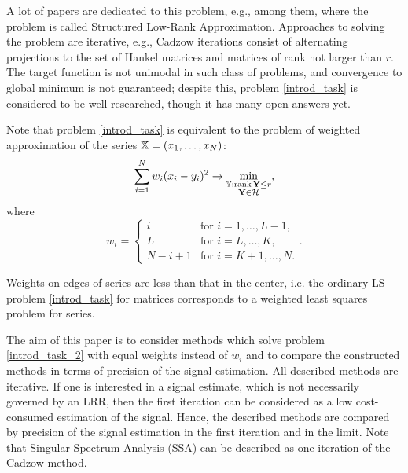 \documentclass[sii]{ipart}
\def\rank{\mathop{\mathrm{rank}}}
\begin{document}
A lot of papers are dedicated to this problem, e.g., \cite{Cadzow1988, Markovsky2011, Usevich.Markovsky2014, Gillard.Zhigljavsky2013} among them, where the problem is called Structured Low-Rank Approximation. Approaches to solving the problem are iterative, e.g., Cadzow iterations \cite{Cadzow1988} consist of alternating projections to the set of Hankel matrices and matrices of rank not larger than $r$. The target function is not unimodal in such class of problems, and convergence to global minimum is not guaranteed; despite this, problem \eqref{introd_task} is considered to be well-researched, though it has many open answers yet.

Note that problem \eqref{introd_task} is equivalent to the problem of weighted approximation of the series $\mathbb{X} = (x_1, \ldots, x_N)$:
\begin{equation}\label{introd_task_2}
\sum_{i = 1}^N w_i(x_i - y_i)^2 \to \min_{\substack{\tsY: \rank \bfY \le r \\ \bfY \in \calH}},
\end{equation}
where
\begin{equation}
\label{eq:w}
w_i = \begin{cases}
i & \text{for $i = 1, \ldots, L-1,$}\\
L & \text{for $i = L, \ldots, K,$}\\
N - i + 1 & \text{for $i = K + 1, \ldots, N.$}
\end{cases}.
\end{equation}

Weights on edges of series are less than that in the center, i.e. the ordinary LS problem \eqref{introd_task} for matrices corresponds to a weighted least squares problem for series.

The aim of this paper is to consider methods which solve problem \eqref{introd_task_2} with equal weights instead of $w_i$ and to compare the constructed methods in terms of precision of the signal estimation. All described methods are iterative. 
If one is interested in a signal estimate, which is not necessarily governed by an LRR, then the first iteration can be considered as a low cost-consumed estimation of the signal.
Hence, the described methods are compared by precision of the signal estimation in the first iteration and in the limit. Note that Singular Spectrum Analysis (SSA) \cite{Broomhead.King1986, Vautard.etal1992, Elsner.Tsonis1996, Golyandina.etal2001, Ghil.etal2002, Golyandina.Zhigljavsky2012} can be
described as one iteration of the Cadzow method.
\end{document}
